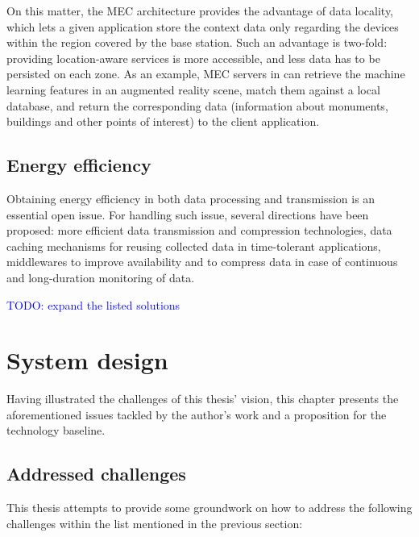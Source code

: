 On this matter, the MEC architecture provides the advantage of data locality, which lets a given application store the context data only regarding the devices within the region covered by the base station. Such an advantage is two-fold: providing location-aware services is more accessible, and less data has to be persisted on each zone. As an example, MEC servers in \cite{mobile-augmented-reality} can retrieve the machine learning features in an augmented reality scene, match them against a local database, and return the corresponding data (information about monuments, buildings and other points of interest) to the client application.

\section{Energy efficiency}

Obtaining energy efficiency in both data processing and transmission is an essential open issue. For handling such issue, several directions have been proposed: more efficient data transmission and compression technologies, data caching mechanisms for reusing collected data in time-tolerant applications, middlewares to improve availability and to compress data in case of continuous and long-duration monitoring of data.

\textcolor{blue}{TODO: expand the listed solutions}

\chapter{System design}
\label{sec:technicals}

Having illustrated the challenges of this thesis' vision, this chapter presents the aforementioned issues tackled by the author's work and a proposition for the technology baseline.

\section{Addressed challenges}

This thesis attempts to provide some groundwork on how to address the following challenges within the list mentioned in the previous section:

